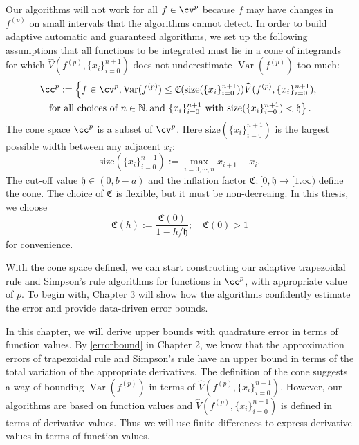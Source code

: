\documentclass{iitthesis}
\DeclareMathOperator{\Var}{Var}
\theoremstyle{definition}
\theoremstyle{remark}
\begin{document}
Our algorithms will not work for all $f \in \cv^{p}$ because $f$ may have changes in $f^{(p)}$ on small intervals that the algorithms cannot detect. In order to build adaptive automatic and guaranteed algorithms, we set up the following assumptions that all functions to be integrated must lie in a cone of integrands for which $\widehat{V}(f^{(p)},\{x_i\}_{i=0}^{n+1})$ does not underestimate $\Var(f^{(p)})$ too much:
\begin{multline}\label{defcone}
\cc^{p}:=\left\{f\in \cv^{p}, \Var(f^{(p)})\leq \mathfrak{C}(\text{size}(\{x_i\}_{i=0}^{n+1}))\widehat{V}(f^{(p)},\{x_i\}_{i=0}^{n+1}),\right.\\ \left.\text{for all choices of } n\in \mathbb{N}, \text{and }\{x_i\}_{i=0}^{n+1} \text{ with }\text{size}(\{x_i\}_{i=0}^{n+1})<\mathfrak{h}\right\}.
\end{multline}
The cone space $\cc^{p}$ is a subset of $\cv^{p}$. Here $\text{size}(\{x_i\}_{i=0}^{n+1})$ is the largest possible width between any adjacent $x_i$:
\begin{equation}\label{defsize}
  \text{size}(\{x_i\}_{i=0}^{n+1}):=\max_{i=0,\cdots, n} x_{i+1}-x_{i}.
\end{equation}
The cut-off value $\mathfrak{h} \in (0, b-a)$ and the inflation factor $\mathfrak{C}: [0,\mathfrak{h} \rightarrow [1.\infty)$ define the cone. The choice of $\mathfrak{C}$ is flexible, but it must be non-decreaing. In this thesis, we choose
\begin{equation}\label{definflationfactor}
  \mathfrak{C}(h):=\frac{\mathfrak{C}(0)}{1-h/\mathfrak{h}}; \quad \mathfrak{C}(0)>1
\end{equation}
for convenience.

With the cone space defined, we can start constructing our adaptive trapezoidal rule and Simpson's rule algorithms for functions in $\cc^{p}$, with appropriate value of $p$. To begin with, Chapter 3 will show how the algorithms confidently estimate the error and provide data-driven error bounds.





In this chapter, we will derive upper bounds with quadrature error in terms of function values. By \eqref{errorbound} in Chapter 2, we know that the approximation errors of trapezoidal rule and Simpson's rule have an upper bound in terms of the total variation of the appropriate derivatives. The definition of the cone suggests a way of bounding $\Var(f^{(p)})$ in terms of $\widehat{V}(f^{(p)},\{x_i\}_{i=0}^{n+1})$. However, our algorithms are based on function values and $\widehat{V}(f^{(p)},\{x_i\}_{i=0}^{n+1})$ is defined in terms of derivative values. Thus we will use finite differences to express derivative values in terms of function values.
\end{document}
